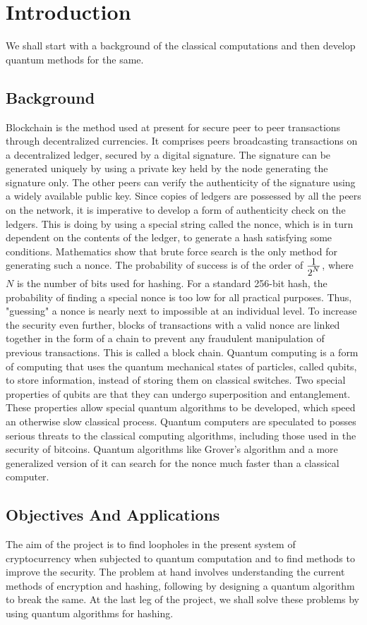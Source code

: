 \section{Introduction}
We shall start with a background of the classical computations and then develop quantum methods for the same.
\subsection{Background}
Blockchain is the method used at present for secure peer to peer transactions through decentralized currencies\cite{btc}. It comprises peers broadcasting transactions on a decentralized ledger, secured by a digital signature. The signature can be generated uniquely by using a private key held by the node generating the signature only. The other peers can verify the authenticity of the signature using a widely available public key. Since copies of ledgers are possessed by all the peers on the network, it is imperative to develop a form of authenticity check on the ledgers. This is doing by using a special string called the nonce, which is in turn dependent on the contents of the ledger, to generate a hash satisfying some conditions. Mathematics show that brute force search is the only method for generating such a nonce. The probability of success is of the order of $\frac{\displaystyle 1}{\displaystyle 2^N}$, where $N$ is the number of bits used for hashing. For a standard 256-bit hash, the probability of finding a special nonce is too low for all practical purposes. Thus, "guessing" a nonce is nearly next to impossible at an individual level. To increase the security even further, blocks of transactions with a valid nonce are linked together in the form of a chain to prevent any fraudulent manipulation of previous transactions. This is called a block chain.
Quantum computing is a form of computing that uses the quantum mechanical states of particles, called qubits, to store information, instead of storing them on classical switches. Two special properties of qubits are that they can undergo superposition and entanglement. These properties allow special quantum algorithms to be developed, which speed an otherwise slow classical process. Quantum computers are speculated to posses serious threats to the classical computing algorithms\cite{enc_br}, including those used in the security of bitcoins. Quantum algorithms like Grover's algorithm and a more generalized version of it can search for the nonce much faster than a classical computer.
\subsection{Objectives And Applications}
The aim of the project is to find loopholes in the present system of cryptocurrency\cite{btc} when subjected to quantum computation and to find methods to improve the security. The problem at hand involves understanding the current methods of encryption and hashing, following by designing a quantum algorithm to break the same. At the last leg of the project, we shall solve these problems by using quantum algorithms for hashing.


